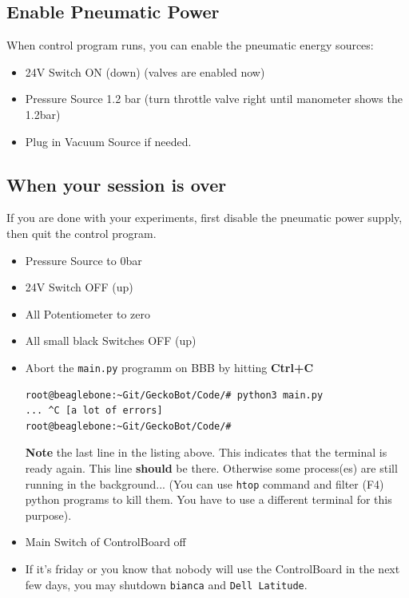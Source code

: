 \documentclass[
	fontsize=10pt
	paper=a4
]{scrartcl}
\begin{document}
\subsection{Enable Pneumatic Power}
When control program runs, you can enable the pneumatic energy sources:

\begin{itemize}
\item 24V Switch ON (down) (valves are enabled now)
\item Pressure Source 1.2 bar (turn throttle valve right until manometer shows the 1.2bar)
\item Plug in Vacuum Source if needed.

\end{itemize}



\subsection{When your session is over}
If you are done with your experiments, first disable the pneumatic power supply, then quit the control program.

\begin{itemize}
\item Pressure Source to 0bar
\item 24V Switch OFF (up)
\item All Potentiometer to zero
\item All small black Switches OFF (up)


\item Abort the \texttt{main.py} programm on BBB by hitting \textbf{Ctrl+C}
\begin{lstlisting}
root@beaglebone:~Git/GeckoBot/Code/# python3 main.py
... ^C [a lot of errors]
root@beaglebone:~Git/GeckoBot/Code/#
\end{lstlisting}

\textbf{Note} the last line in the listing above. This indicates that the terminal is ready again. This line \textbf{should} be there. Otherwise some process(es) are still running in the background... (You can use \texttt{htop} command and filter (F4) python programs to kill them. You have to use a different terminal for this purpose).

\item Main Switch of ControlBoard off

\item If it's friday or you know that nobody will use the ControlBoard in the next few days, you may shutdown \texttt{bianca} and \texttt{Dell Latitude}.

\end{itemize}
\end{document}
